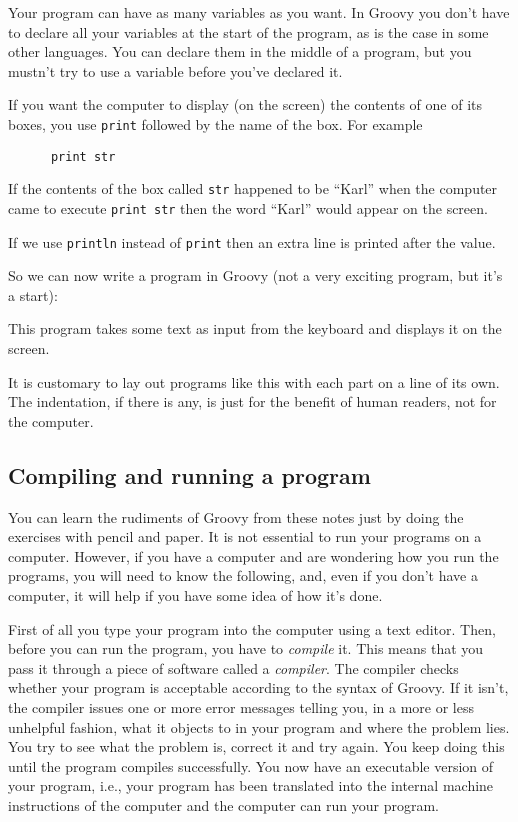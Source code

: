 Your program can have as many variables as you want.  In Groovy you don't
have to declare all your variables at the start of the program, as is the
case in some other languages.  You can declare them in the middle of a
program, but you mustn't try to use a variable before you've declared it.

If you want the computer to display (on the screen) the contents of one of
its boxes, you use \verb!print! followed by the name
of the box.  For example

\begin{Verbatim}
      print str
\end{Verbatim}

If the contents of the box called \verb!str! happened to be ``Karl'' when the
computer came to execute \verb!print str! then the word ``Karl'' would appear
on the screen.  

If we use \verb!println! instead of \verb!print! then an extra line is
printed after the value. 

So we can now write a program in Groovy (not a very exciting program,
but it's a start):


This program takes some text as input from the keyboard and displays it
on the screen.

It is customary to lay out programs like this with each part on a line 
of its own. The indentation, if there is any, is just for the benefit
of human readers, not for the computer.

\subsection{Compiling and running a program}

You can learn the rudiments of Groovy from these notes just by doing the
exercises with pencil and paper.  It is not essential to run your programs
on a computer.  However, if you have a computer and are wondering how
you run the programs, you will need to know the following, and, even if you don't have
a computer, it will help if you have some idea of how it's done.

First of all you type your program into the computer using a text
editor. Then, 
before you can run the program, you have to \emph{compile} it.  This means that
you pass it through a piece
of software called a \emph{compiler}.  The compiler checks whether your program
is acceptable according to the syntax of Groovy.  If it isn't, the compiler
issues one or more error messages telling you, in a more or less unhelpful
fashion, what it objects to in your program and where the problem lies.
You try to see what the problem is, correct it and try again.  You keep
doing this until the program compiles successfully.  You now have an
executable version of your program, i.e., your program has been translated
into the internal machine instructions of the computer and the computer
can run your program.

